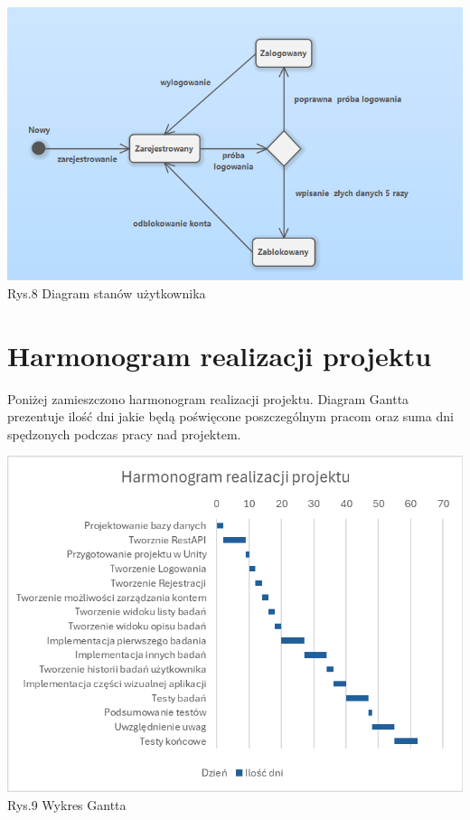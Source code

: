 \documentclass[12pt, letterpaper]{article}
\begin{document}
		\begin{center}
			\includegraphics[scale=0.6]{activeDiagramUser}\\
			\caption{Rys.8 Diagram stanów użytkownika}
		\end{center}
		
		
		\newpage
		\section{Harmonogram realizacji projektu}
		
		Poniżej zamieszczono harmonogram realizacji projektu. Diagram Gantta prezentuje ilość dni jakie będą poświęcone poszczególnym pracom oraz suma dni spędzonych podczas pracy nad projektem.
		
		\begin{center}
			\includegraphics[scale=0.7]{wykres_gantta}\\
			\caption{Rys.9 Wykres Gantta}
		\end{center}
		
\end{document}
